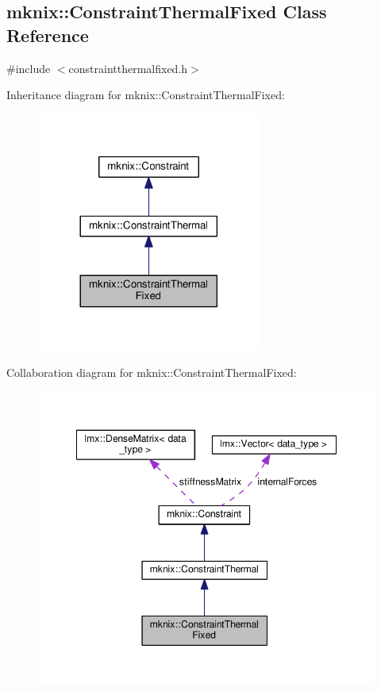 \hypertarget{classmknix_1_1_constraint_thermal_fixed}{}\subsection{mknix\+:\+:Constraint\+Thermal\+Fixed Class Reference}
\label{classmknix_1_1_constraint_thermal_fixed}


{\ttfamily \#include $<$constraintthermalfixed.\+h$>$}



Inheritance diagram for mknix\+:\+:Constraint\+Thermal\+Fixed\+:\nopagebreak
\begin{figure}[H]
\begin{center}
\leavevmode
\includegraphics[width=209pt]{d8/d4e/classmknix_1_1_constraint_thermal_fixed__inherit__graph}
\end{center}
\end{figure}


Collaboration diagram for mknix\+:\+:Constraint\+Thermal\+Fixed\+:\nopagebreak
\begin{figure}[H]
\begin{center}
\leavevmode
\includegraphics[width=348pt]{de/d64/classmknix_1_1_constraint_thermal_fixed__coll__graph}
\end{center}
\end{figure}
